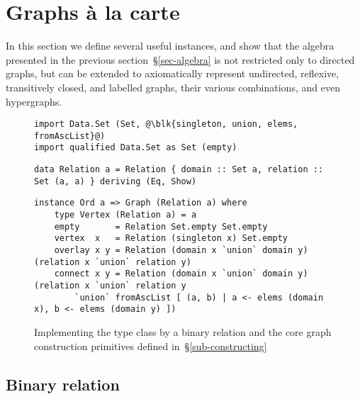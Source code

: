 \section{Graphs \`{a} la carte}\label{sec-a-la-carte}

In this section we define several useful  instances, and
show that the algebra presented in the previous section~\S\ref{sec-algebra} is
not restricted only
to directed graphs, but can be extended to axiomatically represent undirected,
reflexive, transitively closed, and labelled graphs, their various
combinations, and even hypergraphs.

\begin{figure}[b]
\vspace{-3mm}
\begin{verbatim}
import Data.Set (Set, @\blk{singleton, union, elems, fromAscList}@)
import qualified Data.Set as Set (empty)
\end{verbatim}
\vspace{1mm}
\begin{verbatim}
data Relation a = Relation { domain :: Set a, relation :: Set (a, a) } deriving (Eq, Show)
\end{verbatim}
\vspace{1mm}
\begin{verbatim}
instance Ord a => Graph (Relation a) where
    type Vertex (Relation a) = a
    empty       = Relation Set.empty Set.empty
    vertex  x   = Relation (singleton x) Set.empty
    overlay x y = Relation (domain x `union` domain y) (relation x `union` relation y)
    connect x y = Relation (domain x `union` domain y) (relation x `union` relation y
        `union` fromAscList [ (a, b) | a <- elems (domain x), b <- elems (domain y) ])
\end{verbatim}
\vspace{-3mm}
\caption{Implementing the  type class by a binary relation
and the core graph construction primitives
defined in~\S\ref{sub-constructing}\label{fig-relation}}
\vspace{-3mm}
\end{figure}

\subsection{Binary relation}\label{sub-relation}

